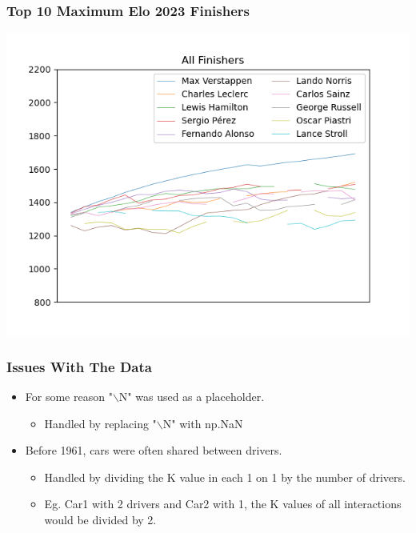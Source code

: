 \documentclass{beamer}
\begin{document}
\begin{frame}
    \frametitle{Top 10 Maximum Elo 2023 Finishers}
    \includegraphics[width=\textwidth]{2023Top10EloFinished.png}
\end{frame}

\begin{frame}
    \frametitle{Issues With The Data}
    \begin{itemize}
        \item For some reason "$\backslash$N" was used as a placeholder.
        \begin{itemize}
            \item Handled by replacing "$\backslash$N" with np.NaN
        \end{itemize}
        \item Before 1961, cars were often shared between drivers.
        \begin{itemize}
            \item Handled by dividing the K value in each 1 on 1 by the number of drivers.
            \item Eg. Car1 with 2 drivers and Car2 with 1, the K values of all interactions would be divided by 2.
        \end{itemize}
    \end{itemize}
\end{frame}
\end{document}
